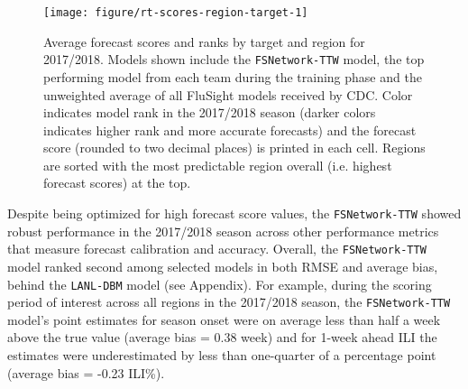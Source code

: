 \documentclass{article}\usepackage[]{graphicx}\usepackage[]{color}
\newenvironment{knitrout}{}{} %
\begin{document}
 
\begin{knitrout}
\color{fgcolor}\begin{figure}
\texttt{[image: figure/rt-scores-region-target-1]} \caption[Average forecast scores and ranks by target and region for 2017/2018]{Average forecast scores and ranks by target and region for 2017/2018. Models shown include the {\tt FSNetwork-TTW} model, the top performing model from each team during the training phase and the unweighted average of all FluSight models received by CDC. Color indicates model rank in the 2017/2018 season (darker colors indicates higher rank and more accurate forecasts) and the forecast score (rounded to two decimal places) is printed in each cell. Regions are sorted with the most predictable region overall (i.e. highest forecast scores) at the top.}\label{fig:rt-scores-region-target}
\end{figure}


\end{knitrout}
 
 






Despite being optimized for high forecast score values, the {\tt FSNetwork-TTW} showed robust performance in the 2017/2018 season across other performance metrics that measure forecast calibration and accuracy.
Overall, the {\tt FSNetwork-TTW} model ranked second among selected models in both RMSE and average bias, behind the {\tt LANL-DBM} model (see Appendix).
For example, during the scoring period of interest across all regions in the 2017/2018 season, the {\tt FSNetwork-TTW} model's point estimates for season onset were on average less than half a week above the true value (average bias =
0.38
week) and for 1-week ahead ILI the estimates were underestimated by less than one-quarter of a percentage point (average bias =
-0.23
ILI\%).
\end{document}
